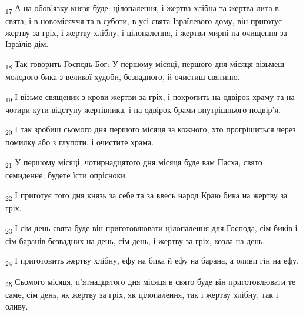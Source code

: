 \begin{tcolorbox}
\textsubscript{17} А на обов'язку князя буде: цілопалення, і жертва хлібна та жертва лита в свята, і в новомісяччя та в суботи, в усі свята Ізраїлевого дому, він приготує жертву за гріх, і жертву хлібну, і цілопалення, і жертви мирні на очищення за Ізраїлів дім.
\end{tcolorbox}
\begin{tcolorbox}
\textsubscript{18} Так говорить Господь Бог: У першому місяці, першого дня місяця візьмеш молодого бика з великої худоби, безвадного, й очистиш святиню.
\end{tcolorbox}
\begin{tcolorbox}
\textsubscript{19} І візьме священик з крови жертви за гріх, і покропить на одвірок храму та на чотири кути відступу жертівника, і на одвірок брами внутрішнього подвір'я.
\end{tcolorbox}
\begin{tcolorbox}
\textsubscript{20} І так зробиш сьомого дня першого місяця за кожного, хто прогрішиться через помилку або з глупоти, і очистите храма.
\end{tcolorbox}
\begin{tcolorbox}
\textsubscript{21} У першому місяці, чотирнадцятого дня місяця буде вам Пасха, свято семиденне; будете їсти опрісноки.
\end{tcolorbox}
\begin{tcolorbox}
\textsubscript{22} І приготує того дня князь за себе та за ввесь народ Краю бика на жертву за гріх.
\end{tcolorbox}
\begin{tcolorbox}
\textsubscript{23} І сім день свята буде він приготовлювати цілопалення для Господа, сім биків і сім баранів безвадних на день, сім день, і жертву за гріх, козла на день.
\end{tcolorbox}
\begin{tcolorbox}
\textsubscript{24} І приготовить жертву хлібну, ефу на бика й ефу на барана, а оливи гін на ефу.
\end{tcolorbox}
\begin{tcolorbox}
\textsubscript{25} Сьомого місяця, п'ятнадцятого дня місяця в свято буде він приготовлювати те саме, сім день, як жертву за гріх, як цілопалення, так і жертву хлібну, так і оливу.
\end{tcolorbox}
